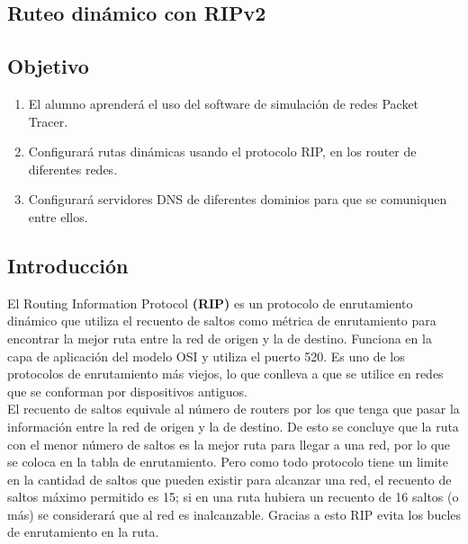 \documentclass[14pt]{book}
\begin{document}
{\color{red} \subsection*{\textbf{Ruteo dinámico con RIPv2}}}
\vspace{1em}

{\color{red} \subsection*{\textbf{Objetivo}}}
\vspace{1em}

\begin{enumerate}
  \item El alumno aprenderá el uso del software de simulación de redes Packet Tracer.
  \item Configurará rutas dinámicas usando el protocolo RIP, en los router de diferentes redes.
  \item Configurará servidores DNS de diferentes dominios para que se comuniquen entre ellos.
\end{enumerate}

{\color{red} \subsection*{\textbf{Introducción}}}
\vspace{1em}

El Routing Information Protocol \textbf{(RIP)} es un protocolo de enrutamiento dinámico que utiliza el
recuento de saltos como métrica de enrutamiento para encontrar la mejor ruta entre la red de
origen y la de destino. Funciona en la capa de aplicación del modelo OSI y utiliza el puerto 520.
Es uno de los protocolos de enrutamiento más viejos, lo que conlleva a que se utilice en redes que
se conforman por dispositivos antiguos.\\

El recuento de saltos equivale al número de routers por los que tenga que pasar la información
entre la red de origen y la de destino. De esto se concluye que la ruta con el menor número de saltos
es la mejor ruta para llegar a una red, por lo que se coloca en la tabla de enrutamiento. Pero como
todo protocolo tiene un limite en la cantidad de saltos que pueden existir para alcanzar una red,
el recuento de saltos máximo permitido es 15; si en una ruta hubiera un recuento de 16 saltos (o
más) se considerará que al red es inalcanzable. Gracias a esto RIP evita los bucles de enrutamiento
en la ruta.\\
\end{document}
